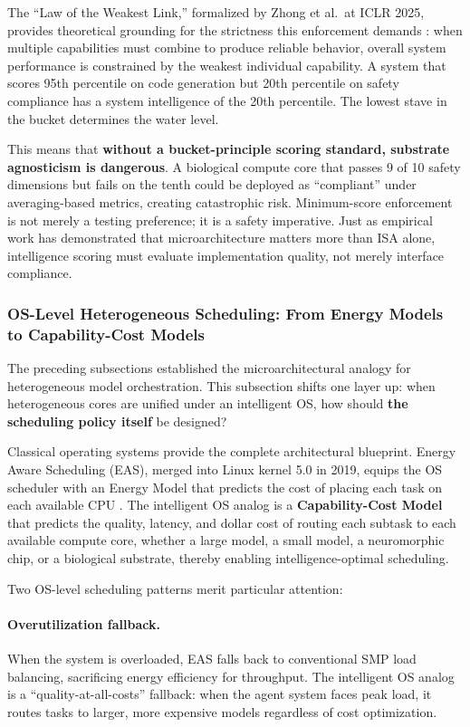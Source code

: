 The ``Law of the Weakest Link,'' formalized by Zhong et al.\ at ICLR 2025, provides theoretical grounding for the strictness this enforcement demands \cite{zhong_2024_weakest_link}: when multiple capabilities must combine to produce reliable behavior, overall system performance is constrained by the weakest individual capability. A system that scores 95th percentile on code generation but 20th percentile on safety compliance has a system intelligence of the 20th percentile. The lowest stave in the bucket determines the water level.

This means that \textbf{without a bucket-principle scoring standard, substrate agnosticism is dangerous}. A biological compute core that passes 9 of 10 safety dimensions but fails on the tenth could be deployed as ``compliant'' under averaging-based metrics, creating catastrophic risk. Minimum-score enforcement is not merely a testing preference; it is a safety imperative. Just as empirical work has demonstrated that microarchitecture matters more than ISA alone, intelligence scoring must evaluate implementation quality, not merely interface compliance.

\subsubsection{OS-Level Heterogeneous Scheduling: From Energy Models to Capability-Cost Models}

The preceding subsections established the microarchitectural analogy for heterogeneous model orchestration. This subsection shifts one layer up: when heterogeneous cores are unified under an intelligent OS, how should \textbf{the scheduling policy itself} be designed?

Classical operating systems provide the complete architectural blueprint. Energy Aware Scheduling (EAS), merged into Linux kernel 5.0 in 2019, equips the OS scheduler with an Energy Model that predicts the cost of placing each task on each available CPU \cite{eas_linux_2019}. The intelligent OS analog is a \textbf{Capability-Cost Model} that predicts the quality, latency, and dollar cost of routing each subtask to each available compute core, whether a large model, a small model, a neuromorphic chip, or a biological substrate, thereby enabling intelligence-optimal scheduling.

Two OS-level scheduling patterns merit particular attention:

\paragraph{Overutilization fallback.}
When the system is overloaded, EAS falls back to conventional SMP load balancing, sacrificing energy efficiency for throughput. The intelligent OS analog is a ``quality-at-all-costs'' fallback: when the agent system faces peak load, it routes tasks to larger, more expensive models regardless of cost optimization.

